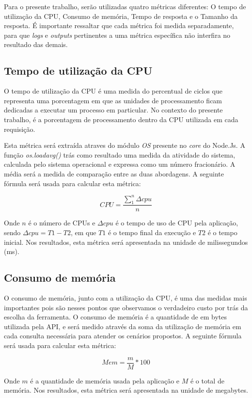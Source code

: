 Para o presente trabalho, serão utilizadas quatro métricas diferentes: O tempo de utilização da CPU, Consumo de memória, Tempo de resposta e o Tamanho da resposta. É importante ressaltar que cada métrica foi medida separadamente, para que \textit{logs} e \textit{outputs} pertinentes a uma métrica específica não interfira no resultado das demais.

\subsection*{Tempo de utilização da CPU}

O tempo de utilização da CPU é uma medida do percentual de ciclos que representa uma porcentagem em que as unidades de processamento ficam dedicadas a executar um processo em particular. No contexto do presente trabalho, é a porcentagem de processamento dentro da CPU utilizada em cada requisição.

Esta métrica será extraída atraves do módulo \textit{OS} presente no \textit{core} do Node.Js. A função \textit{os.loadavg()} trás como resultado uma medida da atividade do sistema, calculada pelo sistema operacional e expressa como um número fracionário. A média será a medida de comparação entre as duas abordagens. A seguinte fórmula será usada para calcular esta métrica: 

$$ CPU = \frac{\sum\limits_{1}^{n} \Delta cpu}{n} $$

Onde $n$ é o número de CPUs e $\Delta cpu$ é o tempo de uso de CPU pela aplicação, sendo $\Delta cpu = T1 - T2$, em que $T1$ é o tempo final da execução e $T2$ é o tempo inicial. Nos resultados, esta métrica será apresentada na unidade de milissegundos (ms).

\subsection*{Consumo de memória}

O consumo de memória, junto com a utilização da CPU, é uma das medidas mais importantes pois são nesses pontos que observamos o verdadeiro custo por trás da escolha da ferramenta. O consumo de memória é a quantidade de em bytes utilizada pela API, e será medido através da soma da utilização de memória em cada consulta necessária para atender os cenários propostos. A seguinte fórmula será usada para calcular esta métrica: 

$$ Mem = \frac{m}{M}*100 $$

Onde $m$ é a quantidade de memória usada pela aplicação e $M$ é o total de memória. Nos resultados, esta métrica será apresentada na unidade de megabytes.

